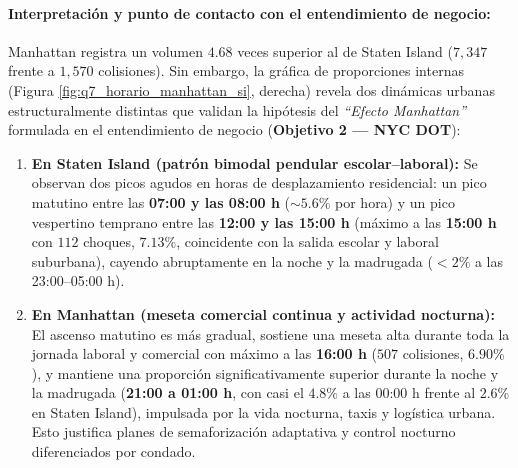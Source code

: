 \paragraph{Interpretación y punto de contacto con el entendimiento de negocio:}
Manhattan registra un volumen $4.68$ veces superior al de Staten Island ($7,347$ frente a $1,570$ colisiones). Sin embargo, la gráfica de proporciones internas (Figura \ref{fig:q7_horario_manhattan_si}, derecha) revela dos dinámicas urbanas estructuralmente distintas que validan la hipótesis del \textit{``Efecto Manhattan''} formulada en el entendimiento de negocio (\textbf{Objetivo 2 --- NYC DOT}):
\begin{enumerate}
    \item \textbf{En Staten Island (patrón bimodal pendular escolar--laboral):} Se observan dos picos agudos en horas de desplazamiento residencial: un pico matutino entre las \textbf{07:00 y las 08:00 h} ($\sim 5.6\%$ por hora) y un pico vespertino temprano entre las \textbf{12:00 y las 15:00 h} (máximo a las \textbf{15:00 h} con $112$ choques, $7.13\%$, coincidente con la salida escolar y laboral suburbana), cayendo abruptamente en la noche y la madrugada ($<2\%$ a las 23:00--05:00 h).
    \item \textbf{En Manhattan (meseta comercial continua y actividad nocturna):} El ascenso matutino es más gradual, sostiene una meseta alta durante toda la jornada laboral y comercial con máximo a las \textbf{16:00 h} ($507$ colisiones, $6.90\%$), y mantiene una proporción significativamente superior durante la noche y la madrugada (\textbf{21:00 a 01:00 h}, con casi el $4.8\%$ a las 00:00 h frente al $2.6\%$ en Staten Island), impulsada por la vida nocturna, taxis y logística urbana. Esto justifica planes de semaforización adaptativa y control nocturno diferenciados por condado.
\end{enumerate}

